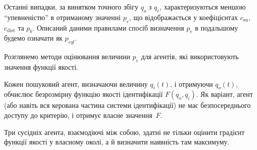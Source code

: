 \documentclass[a4paper,13pt]{atuaref}
\begin{document}
Останні випадки, за винятком точного збігу $q_o$ з $q_c$,
характеризуються меншою ``упевненістю'' в отриманому значенні $p_e$,
що відображається у коефіцієнтах
$c_\mathrm{su}$, $c_\mathrm{dist}$ та  $p_b$.
%
Описаний даними правилами спосіб визначення $ p_e $ в подальшому будемо
означати як $p_{eql} $\label{atu:d:p_eql}.


Розглянемо методи оцінювання величини $p_e$ для агентів, які використовують значення функції якості.

Кожен пошуковий агент, визначаючи величину $q_{i}(t) $, і отримуючи $q_o(t)$,
обчислює безрозмірну функцію якості ідентифікації $ F (q_o, q_i) $. Як
варіант, агент (або навіть вся керована частина системи ідентифікації) не має
безпосереднього доступу до критерію, і отримує власне значення~$F$.

Три сусідніх агента, взаємодіючі між собою, здатні не тільки оцінити градієнт
функції якості у власному околі, а й визначити наявність там
максимуму.
\end{document}
